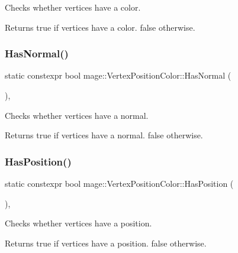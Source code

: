 Checks whether vertices have a color.

\begin{DoxyReturn}{Returns}
{\ttfamily true} if vertices have a color. {\ttfamily false} otherwise. 
\end{DoxyReturn}
\hypertarget{structmage_1_1_vertex_position_color_a53289aa86f3de21ba083d33dd18fafb8}{}\label{structmage_1_1_vertex_position_color_a53289aa86f3de21ba083d33dd18fafb8} 
\subsubsection{\texorpdfstring{Has\+Normal()}{HasNormal()}}
{\footnotesize\ttfamily static constexpr bool mage\+::\+Vertex\+Position\+Color\+::\+Has\+Normal (\begin{DoxyParamCaption}{ }\end{DoxyParamCaption})\hspace{0.3cm}{\ttfamily [static]}, {\ttfamily [noexcept]}}

Checks whether vertices have a normal.

\begin{DoxyReturn}{Returns}
{\ttfamily true} if vertices have a normal. {\ttfamily false} otherwise. 
\end{DoxyReturn}
\hypertarget{structmage_1_1_vertex_position_color_a254be63b468600a4a60639644d34086b}{}\label{structmage_1_1_vertex_position_color_a254be63b468600a4a60639644d34086b} 
\subsubsection{\texorpdfstring{Has\+Position()}{HasPosition()}}
{\footnotesize\ttfamily static constexpr bool mage\+::\+Vertex\+Position\+Color\+::\+Has\+Position (\begin{DoxyParamCaption}{ }\end{DoxyParamCaption})\hspace{0.3cm}{\ttfamily [static]}, {\ttfamily [noexcept]}}

Checks whether vertices have a position.

\begin{DoxyReturn}{Returns}
{\ttfamily true} if vertices have a position. {\ttfamily false} otherwise. 
\end{DoxyReturn}
\hypertarget{structmage_1_1_vertex_position_color_a34d7619b86890e49bd7678d333a50eef}{}\label{structmage_1_1_vertex_position_color_a34d7619b86890e49bd7678d333a50eef} 
